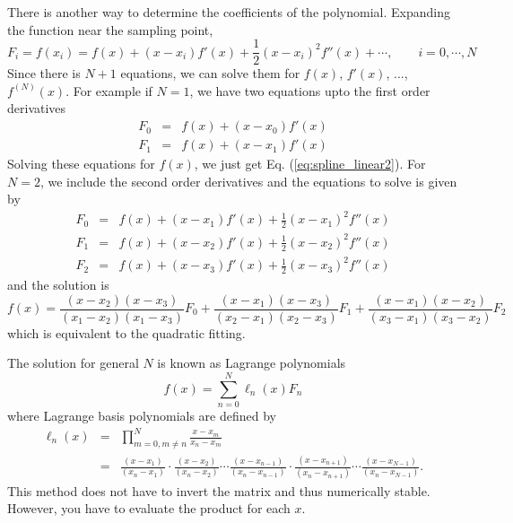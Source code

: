 There is another way to determine the coefficients of the polynomial.  Expanding the function near the sampling point,
\begin{equation}
F_i  = f(x_i) = f(x) + (x-x_i) f'(x) + \frac{1}{2} (x-x_i)^2 f''(x) + \cdots, \qquad i=0, \cdots, N
\end{equation}
Since there is $N+1$ equations, we can solve them for $f(x)$, $f'(x)$, ..., $f^{(N)}(x)$.  For example if $N=1$,
we have two equations upto the first order derivatives
\begin{subequations}
\begin{eqnarray}
F_0 &=& f(x) + (x-x_0) f'(x) \\
F_1 &=& f(x) + (x-x_1) f'(x) 
\end{eqnarray}
\end{subequations}
Solving these equations for $f(x)$, we just get Eq. (\ref{eq:spline_linear2}). For $N=2$, we include the second order derivatives and the equations to solve is given by
\begin{subequations}
\begin{eqnarray}
F_0 &=& f(x) + (x-x_1) f'(x) + \frac{1}{2} (x-x_1)^2 f''(x) \\
F_1 &=& f(x) + (x-x_2) f'(x) + \frac{1}{2} (x-x_2)^2 f''(x) \\
F_2 &=& f(x) + (x-x_3) f'(x) + \frac{1}{2} (x-x_3)^2 f''(x)
\end{eqnarray}
\end{subequations}
and the solution is
\begin{equation}
f(x) = \frac{(x-x_2)(x-x_3)}{(x_1-x_2)(x_1-x_3)} F_0
+\frac{(x-x_1)(x-x_3)}{(x_2-x_1)(x_2-x_3)} F_1
+\frac{(x-x_1)(x-x_2)}{(x_3-x_1)(x_3-x_2)} F_2
\end{equation}
which is equivalent to the quadratic fitting. 

The solution for general $N$ is known as Lagrange polynomials
\begin{equation}
f(x) = \sum_{n=0}^{N} \ell_n(x) F_n
\end{equation}
where Lagrange basis polynomials are defined by
\begin{eqnarray}
\ell_n(x) &=& \prod_{m=0, m\ne n}^{N} \frac{x-x_m}{x_n-x_m} \\
&=& \frac{(x-x_1)}{(x_n-x_1)}\cdot \frac{(x-x_2)}{(x_n-x_2)} \cdots \frac{(x-x_{n-1})}{(x_n-x_{n-1})} \cdot 
\frac{(x-x_{n+1})}{(x_n-x_{n+1})} \cdots \frac{(x-x_{N-1})}{(x_n-x_{N-1})} .
\end{eqnarray}
This method does not have to invert the matrix and thus numerically stable.  However, you have to evaluate the product for each $x$.

